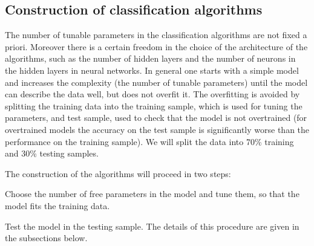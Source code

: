 \subsection{Construction of classification algorithms}

The number of tunable parameters in the classification algorithms are not fixed a priori. 
Moreover there is a certain freedom in the choice of the architecture of the algorithms, such as
the number of hidden layers and the number of neurons in the hidden layers in neural networks.
In general one starts with a simple model and increases the complexity (the number of tunable parameters)
until the model can describe the data well, but does not overfit it.
The overfitting is avoided by splitting the training data into the training sample, which is used for tuning the parameters,
and test sample, used to check that the model is not overtrained (for overtrained models the accuracy on the test
sample is significantly worse than the performance on the training sample).
We will split the data into 70\% training and 30\% testing samples.

The construction of the algorithms will proceed in two steps:
\bi
\item
Choose the number of free parameters in the model and tune them, so that the model fits the training data.
\item
Test the model in the testing sample.
\ei
The details of this procedure are given in the subsections below.


